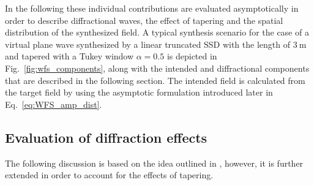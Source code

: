 \documentclass[lettersize,journal]{IEEEtran}
\begin{document}
In the following these individual contributions are evaluated asymptotically in order to describe diffractional waves, the effect of tapering and the spatial distribution of the synthesized field.
A typical synthesis scenario for the case of a virtual plane wave synthesized by a linear truncated SSD with the length of $3~\mathrm{m}$ and tapered with a Tukey window $\alpha = 0.5$ is depicted in Fig.~\ref{fig:wfs_components}, along with the intended and diffractional components that are described in the following section.
The intended field is calculated from the target field by using the asymptotic formulation introduced later in Eq.~\eqref{eq:WFS_amp_dist}.


\subsection{Evaluation of diffraction effects}
The following discussion is based on the idea outlined in \cite[Sec. 4.3.1]{Start1997:phd}, however, it is further extended in order to account for the effects of tapering.
\end{document}

